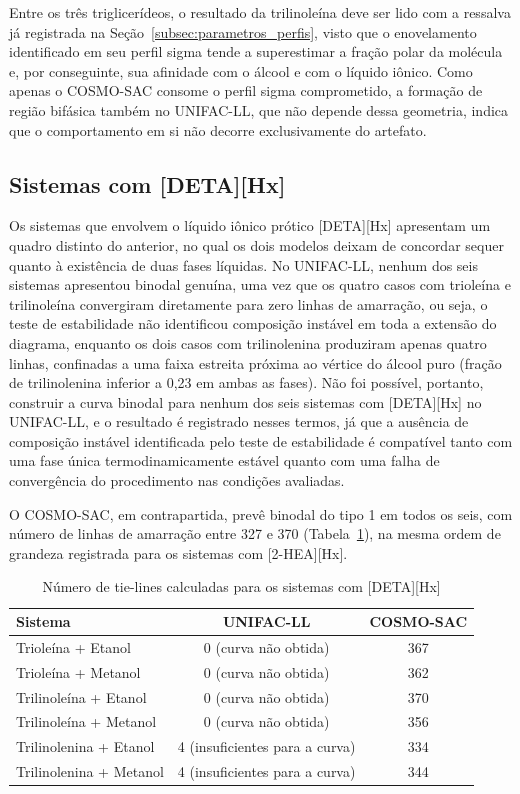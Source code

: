 Entre os três triglicerídeos, o resultado da trilinoleína deve ser lido com a ressalva já registrada na Seção~\ref{subsec:parametros_perfis}, visto que o enovelamento identificado em seu perfil sigma tende a superestimar a fração polar da molécula e, por conseguinte, sua afinidade com o álcool e com o líquido iônico. Como apenas o COSMO-SAC consome o perfil sigma comprometido, a formação de região bifásica também no UNIFAC-LL, que não depende dessa geometria, indica que o comportamento em si não decorre exclusivamente do artefato.

\subsection{Sistemas com [DETA][Hx]}
\label{subsec:resultados_deta}

Os sistemas que envolvem o líquido iônico prótico [DETA][Hx] apresentam um quadro distinto do anterior, no qual os dois modelos deixam de concordar sequer quanto à existência de duas fases líquidas. No UNIFAC-LL, nenhum dos seis sistemas apresentou binodal genuína, uma vez que os quatro casos com trioleína e trilinoleína convergiram diretamente para zero linhas de amarração, ou seja, o teste de estabilidade não identificou composição instável em toda a extensão do diagrama, enquanto os dois casos com trilinolenina produziram apenas quatro linhas, confinadas a uma faixa estreita próxima ao vértice do álcool puro (fração de trilinolenina inferior a 0,23 em ambas as fases). Não foi possível, portanto, construir a curva binodal para nenhum dos seis sistemas com [DETA][Hx] no UNIFAC-LL, e o resultado é registrado nesses termos, já que a ausência de composição instável identificada pelo teste de estabilidade é compatível tanto com uma fase única termodinamicamente estável quanto com uma falha de convergência do procedimento nas condições avaliadas.

O COSMO-SAC, em contrapartida, prevê binodal do tipo 1 em todos os seis, com número de linhas de amarração entre 327 e 370 (Tabela~\ref{tab:tielines_deta}), na mesma ordem de grandeza registrada para os sistemas com [2-HEA][Hx].

\begin{table}[htb]
\centering
\caption{Número de tie-lines calculadas para os sistemas com [DETA][Hx]}
\label{tab:tielines_deta}
\begin{tabular}{lcc}
\hline
Sistema & UNIFAC-LL & COSMO-SAC \\
\hline
Trioleína + Etanol      & 0 (curva não obtida) & 367 \\
Trioleína + Metanol     & 0 (curva não obtida) & 362 \\
Trilinoleína + Etanol   & 0 (curva não obtida) & 370 \\
Trilinoleína + Metanol  & 0 (curva não obtida) & 356 \\
Trilinolenina + Etanol  & 4 (insuficientes para a curva) & 334 \\
Trilinolenina + Metanol & 4 (insuficientes para a curva) & 344 \\
\hline
\end{tabular}
\end{table}

